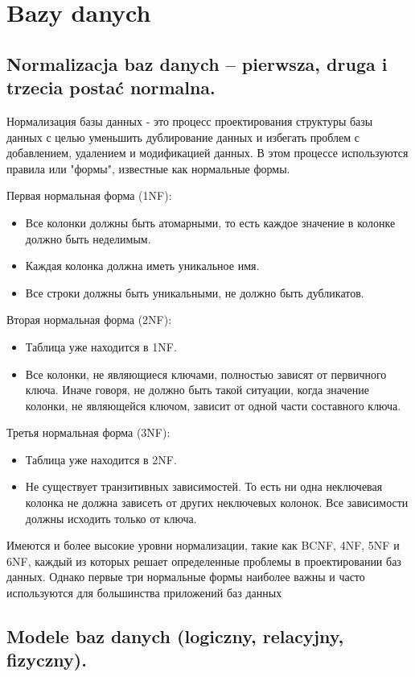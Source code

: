 \chapter{Bazy danych}
\section{Normalizacja baz danych – pierwsza, druga i trzecia postać normalna.}
Нормализация базы данных - это процесс проектирования структуры базы данных с целью уменьшить дублирование данных 
и избегать проблем с добавлением, удалением и модификацией данных. 
В этом процессе используются правила или "формы", известные как нормальные формы.

Первая нормальная форма (1NF):
\begin{itemize}
\item Все колонки должны быть атомарными, то есть каждое значение в колонке должно быть неделимым.
\item Каждая колонка должна иметь уникальное имя.
\item Все строки должны быть уникальными, не должно быть дубликатов.
\end{itemize}

Вторая нормальная форма (2NF):
\begin{itemize}
\item Таблица уже находится в 1NF.
\item Все колонки, не являющиеся ключами, полностью зависят от первичного ключа. Иначе говоря, не должно быть такой ситуации, когда значение колонки, не являющейся ключом, зависит от одной части составного ключа.
\end{itemize}

Третья нормальная форма (3NF):
\begin{itemize}
\item Таблица уже находится в 2NF.
\item Не существует транзитивных зависимостей. То есть ни одна неключевая колонка не должна зависеть от других неключевых колонок. Все зависимости должны исходить только от ключа.
\end{itemize}

Имеются и более высокие уровни нормализации, такие как BCNF, 4NF, 5NF и 6NF, каждый из которых решает определенные проблемы в проектировании баз данных. Однако первые три нормальные формы наиболее важны и часто используются для большинства приложений баз данных

\section{Modele baz danych (logiczny, relacyjny, fizyczny).}

